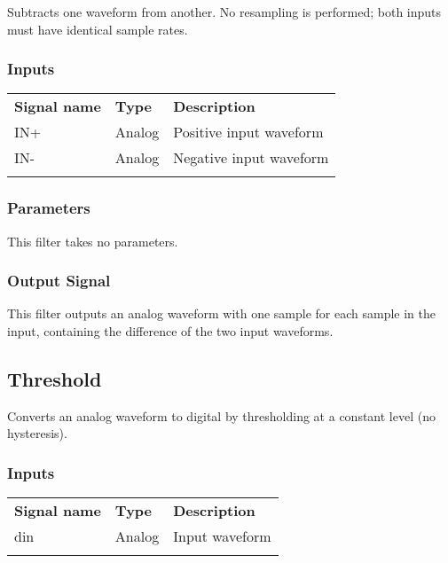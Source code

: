 Subtracts one waveform from another. No resampling is performed; both inputs must have identical sample rates.

\subsubsection{Inputs}

\begin{tabularx}{16cm}{llX}
\thickhline
\textbf{Signal name} & \textbf{Type} & \textbf{Description} \\
\thickhline
IN+ & Analog & Positive input waveform \\
\thickhline
IN- & Analog & Negative input waveform \\
\thickhline
\end{tabularx}

\subsubsection{Parameters}

This filter takes no parameters.

\subsubsection{Output Signal}

This filter outputs an analog waveform with one sample for each sample in the input, containing the difference of the
two input waveforms.

\pagebreak
\subsection{Threshold}

Converts an analog waveform to digital by thresholding at a constant level (no hysteresis).

\subsubsection{Inputs}

\begin{tabularx}{16cm}{llX}
\thickhline
\textbf{Signal name} & \textbf{Type} & \textbf{Description} \\
\thickhline
din & Analog & Input waveform \\
\thickhline
\end{tabularx}

